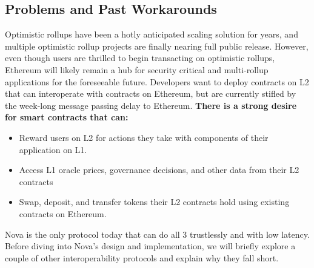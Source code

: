 \documentclass[sigplan,screen,nonacm]{acmart}
\begin{document}
\subsection{Problems and Past Workarounds} 

Optimistic rollups have been a hotly anticipated scaling solution for years, and multiple optimistic rollup projects are finally nearing full public release. However, even though users are thrilled to begin transacting on optimistic rollups, Ethereum will likely remain a hub for security critical and multi-rollup applications for the foreseeable future. Developers want to deploy contracts on L2 that can interoperate with contracts on Ethereum, but are currently stifled by the week-long message passing delay to Ethereum. \textbf{There is a strong desire for smart contracts that can:}

\begin{itemize}
  \setlength\itemsep{2mm}
  \item Reward users on L2 for actions they take with components of their application on L1.
 
  \item Access L1 oracle prices, governance decisions, and other data from their L2 contracts
 
  \item Swap, deposit, and transfer tokens their L2 contracts hold using existing contracts on Ethereum.
\end{itemize}

Nova is the only protocol today that can do all 3 trustlessly and with low latency. Before diving into Nova's design and implementation, we will briefly explore a couple of other interoperability protocols and explain why they fall short.
\end{document}
